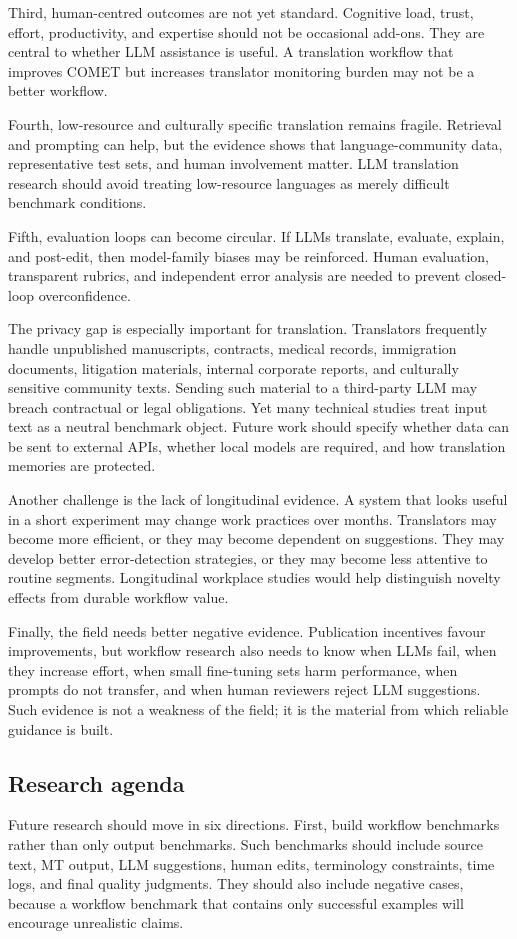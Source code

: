 \documentclass[11pt]{article}
\begin{document}
Third, human-centred outcomes are not yet standard. Cognitive load, trust, effort, productivity, and expertise should not be occasional add-ons. They are central to whether LLM assistance is useful. A translation workflow that improves COMET but increases translator monitoring burden may not be a better workflow.

Fourth, low-resource and culturally specific translation remains fragile. Retrieval and prompting can help, but the evidence shows that language-community data, representative test sets, and human involvement matter. LLM translation research should avoid treating low-resource languages as merely difficult benchmark conditions.

Fifth, evaluation loops can become circular. If LLMs translate, evaluate, explain, and post-edit, then model-family biases may be reinforced. Human evaluation, transparent rubrics, and independent error analysis are needed to prevent closed-loop overconfidence.


The privacy gap is especially important for translation. Translators frequently handle unpublished manuscripts, contracts, medical records, immigration documents, litigation materials, internal corporate reports, and culturally sensitive community texts. Sending such material to a third-party LLM may breach contractual or legal obligations. Yet many technical studies treat input text as a neutral benchmark object. Future work should specify whether data can be sent to external APIs, whether local models are required, and how translation memories are protected.

Another challenge is the lack of longitudinal evidence. A system that looks useful in a short experiment may change work practices over months. Translators may become more efficient, or they may become dependent on suggestions. They may develop better error-detection strategies, or they may become less attentive to routine segments. Longitudinal workplace studies would help distinguish novelty effects from durable workflow value.

Finally, the field needs better negative evidence. Publication incentives favour improvements, but workflow research also needs to know when LLMs fail, when they increase effort, when small fine-tuning sets harm performance, when prompts do not transfer, and when human reviewers reject LLM suggestions. Such evidence is not a weakness of the field; it is the material from which reliable guidance is built.


\subsection{Research agenda}
Future research should move in six directions. First, build workflow benchmarks rather than only output benchmarks. Such benchmarks should include source text, MT output, LLM suggestions, human edits, terminology constraints, time logs, and final quality judgments. They should also include negative cases, because a workflow benchmark that contains only successful examples will encourage unrealistic claims.
\end{document}
